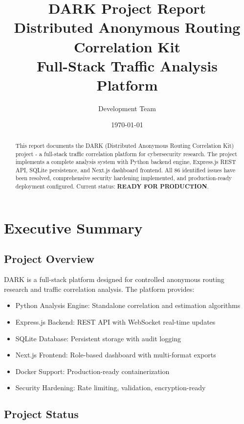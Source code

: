 \documentclass[12pt,a4paper]{report}
\title{DARK Project Report\\
\large Distributed Anonymous Routing Correlation Kit\\
\normalsize Full-Stack Traffic Analysis Platform}
\author{Development Team}
\date{\today}
\begin{document}
\maketitle

\begin{abstract}
This report documents the DARK (Distributed Anonymous Routing Correlation Kit) project - a full-stack traffic correlation platform for cybersecurity research. The project implements a complete analysis system with Python backend engine, Express.js REST API, SQLite persistence, and Next.js dashboard frontend. All 86 identified issues have been resolved, comprehensive security hardening implemented, and production-ready deployment configured. Current status: \textbf{READY FOR PRODUCTION}.
\end{abstract}

\tableofcontents
\newpage

\chapter{Executive Summary}

\section{Project Overview}

DARK is a full-stack platform designed for controlled anonymous routing research and traffic correlation analysis. The platform provides:

\begin{itemize}
    \item Python Analysis Engine: Standalone correlation and estimation algorithms
    \item Express.js Backend: REST API with WebSocket real-time updates  
    \item SQLite Database: Persistent storage with audit logging
    \item Next.js Frontend: Role-based dashboard with multi-format exports
    \item Docker Support: Production-ready containerization
    \item Security Hardening: Rate limiting, validation, encryption-ready
\end{itemize}

\section{Project Status}
\end{document}
